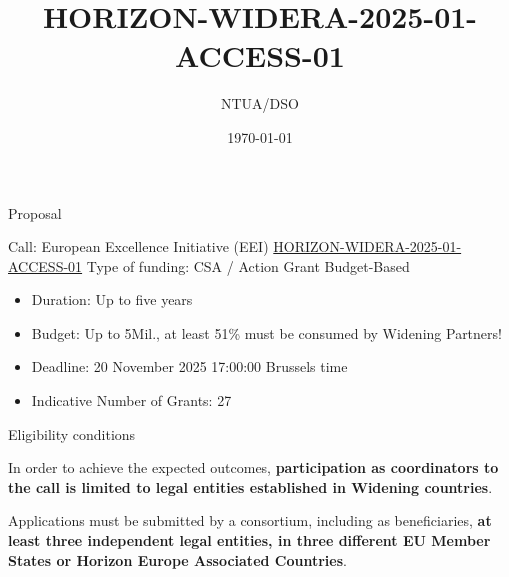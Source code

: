 \documentclass{beamer}
\title{HORIZON-WIDERA-2025-01-ACCESS-01}
\author{NTUA/DSO}
\date{\today}
\begin{document}
\begin{frame}
  \titlepage
\end{frame}

\begin{frame}{Proposal}

Call:
\vspace{1cm}
European Excellence Initiative (EEI)
\href{https://ec.europa.eu/info/funding-tenders/opportunities/portal/screen/opportunities/topic-details/HORIZON-WIDERA-2025-01-ACCESS-01}{HORIZON-WIDERA-2025-01-ACCESS-01}
Type of funding: CSA / Action Grant Budget-Based

\vspace{1cm}

  \begin{itemize}
    \item Duration: Up to five years
    \item Budget: Up to 5Mil., at least 51\% must be consumed by Widening Partners!
    \item Deadline: 20 November 2025 17:00:00 Brussels time
    \item Indicative Number of Grants: 27
  \end{itemize}
\end{frame}

\begin{frame}{Eligibility conditions}

In order to achieve the expected outcomes, \textbf{participation as coordinators to
the call is limited to legal entities established in Widening countries}.

\vspace{1cm}

Applications must be submitted by a consortium, including as
beneficiaries, \textbf{at least three independent legal entities, in three different EU
Member States or Horizon Europe Associated Countries}.
\end{frame}
\end{document}
